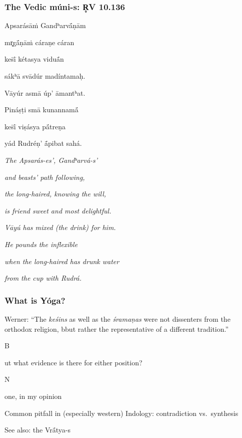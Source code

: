 \documentclass[pdf]{beamer}
\newcommand{\Subitem}[1]{{\setlength\itemindent{12pt} \item[-] #1}}
\begin{document}
\begin{frame} \frametitle{The Vedic múni-s: R̥V 10.136}
\begin{center}
\begin{multicols}{2}
\scriptsize{
	Apsarásāṁ Gandʰarvā́ṇām

	mr̥gā́ṇāṁ cáraṇe cáran

	keṡī́ kétasya viduā́n

	sákʰā svādúr madíntamaḥ.

	\vspace{\baselineskip}

	Vāyúr asmā úp’ āmantʰat.

	Pináṣṭi smā kunannamā́

	keṡī́ viṣásya pā́treṇa

	yád Rudréṇ’ ā́pibat sahá.
	
	\columnbreak

	\textit{The Apsarás-es', Gandʰarvá-s'}

	\textit{and beasts' path following,}

	\textit{the long-haired, knowing the will,}

	\textit{is friend sweet and most delightful.}

	\vspace{\baselineskip}

	\textit{Vāyú has mixed (the drink) for him.}

	\textit{He pounds the inflexible}

	\textit{when the long-haired has drunk water}

	\textit{from the cup with Rudrá.}

}
\end{multicols}
\end{center}
\end{frame}

\begin{frame} \frametitle{What is Yóga?}
\begin{itemize}
	\item Werner: ``The \emph{keśins} as well as the \emph{śramaṇas} were not dissenters from the orthodox religion, bbut rather the representative of a different tradition.''
	\Subitem But what evidence is there for either position?
	\Subitem None, in my opinion
	\item Common pitfall in (especially western) Indology: contradiction vs.~synthesis
	\item See also: the Vrā́tya-s
\end{itemize}
\end{frame}
\end{document}
